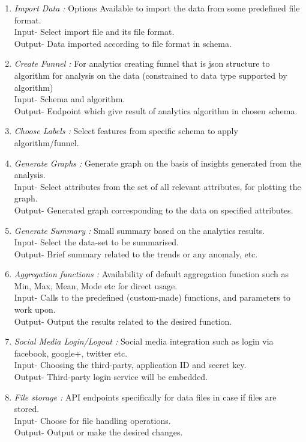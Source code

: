 \documentclass[a4paper,12pt]{report}
\begin{document}
\begin{enumerate}
{        Input- Select schema or info to export and file format.\\
        Output- Export data in standard file format eg csv, xml, json etc.  
      }
      \item {\emph {Import Data :}  Options Available to import the data from some predefined file format. \\
        Input- Select import file and its file format. \\
        Output- Data imported according to file format in schema.
      }
      \item {\emph {Create Funnel :}   For analytics creating funnel that is json structure to algorithm for analysis on the data (constrained to data type supported by algorithm) \\
        Input- Schema and algorithm. \\
        Output- Endpoint which give result of analytics algorithm in chosen schema.  
      }
      \item { \emph {Choose Labels :} Select features from specific schema to apply algorithm/funnel. }
      \item {\emph {Generate Graphs :}   Generate graph on the basis of insights generated from the analysis. \\
        Input- Select attributes from the set of all relevant attributes, for plotting the graph.\\
        Output- Generated graph corresponding to the data on specified attributes.
      }
      \item {\emph {Generate Summary :}    Small summary based on the analytics results. \\
      Input- Select the data-set to be summarised.\\
      Output- Brief summary related to the trends or any anomaly, etc.
      }
      \item {\emph {Aggregation functions :} Availability of default aggregation function such as Min, Max, Mean, Mode etc for direct usage. \\
        Input- Calls to the predefined (custom-made) functions, and parameters to work upon. \\
        Output- Output the results related to the desired function.
      }
      \item {\emph {Social Media Login/Logout :} Social media integration such as login via facebook, google+, twitter etc. \\
        Input- Choosing the third-party, application ID and secret key. \\
        Output- Third-party login service will be embedded.
      }
      \item {\emph {File storage : } API endpoints specifically for data files in case if files are stored. \\
        Input- Choose for file handling operations. \\
        Output- Output or make the desired changes.
      }
      \end{enumerate}
    \vfill
\end{document}
